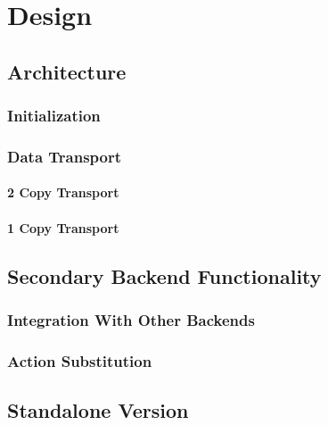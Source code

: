 
\chapter{Design}\label{chapter:design}


\section{Architecture}

\subsection{Initialization}

\subsection{Data Transport}

\subsubsection{2 Copy Transport}

\subsubsection{1 Copy Transport}


\section{Secondary Backend Functionality}

\subsection{Integration With Other Backends}

\subsection{Action Substitution}


\section{Standalone Version}